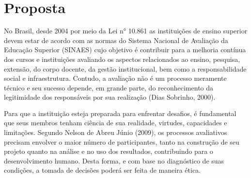 \chapter{Proposta}\label{chp:PROPOSTA}

No Brasil, desde 2004 por meio da Lei n° 10.861 as instituições de ensino superior devem estar de acordo com as normas do Sistema Nacional de Avaliação da Educação Superior (SINAES)
cujo objetivo é contribuir para a melhoria contínua dos cursos e instituições avaliando 
os aspectos relacionados ao ensino, pesquisa, extensão, do corpo docente, da gestão institucional, bem como a responsabilidade social e infraestrutura.
Contudo, a avaliação não é um processo meramente técnico e seu sucesso depende, em grande parte, do reconhecimento da legitimidade dos responsáveis por sua realização (Dias Sobrinho, 2000). 

Para que a instituição esteja preparada para enfrentar desafios, é fundamental que seus membros tenham ciência de sua realidade, virtudes, capacidades e limitações.
Segundo Nelson de Abreu Júnio (2009), os processos avaliativos precisam envolver o maior número de participantes, tanto na construção de seu projeto quanto na análise e no uso dos resultados, contribuindo para o desenvolvimento humano. Desta forma, e com base no diagnóstico de suas condições, a tomada de decisões poderá ser feita de maneira ética.


%


